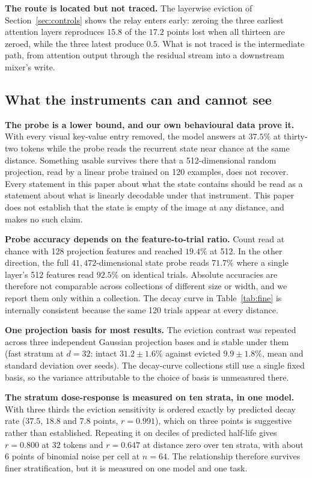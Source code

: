 \documentclass[11pt]{article}
\begin{document}
\textbf{The route is located but not traced.} The layerwise eviction of
Section~\ref{sec:controls} shows the relay enters early: zeroing the three
earliest attention layers reproduces $15.8$ of the $17.2$ points lost when all
thirteen are zeroed, while the three latest produce $0.5$. What is not traced is
the intermediate path, from attention output through the residual stream into a
downstream mixer's write.

\subsection{What the instruments can and cannot see}

\textbf{The probe is a lower bound, and our own behavioural data prove it.}
With every visual key-value entry removed, the model answers at $37.5\%$ at
thirty-two tokens while the probe reads the recurrent state near chance at the
same distance. Something usable survives there that a 512-dimensional random
projection, read by a linear probe trained on 120 examples, does not recover.
Every statement in this paper about what the state contains should be read as a
statement about what is linearly decodable under that instrument. This paper does
not establish that the state is empty of the image at any distance, and makes no
such claim.

\textbf{Probe accuracy depends on the feature-to-trial ratio.} Count read at
chance with 128 projection features and reached $19.4\%$ at 512. In the other
direction, the full $41{,}472$-dimensional state probe reads $71.7\%$ where a
single layer's 512 features read $92.5\%$ on identical trials. Absolute
accuracies are therefore not comparable across collections of different size or
width, and we report them only within a collection. The decay curve in
Table~\ref{tab:fine} is internally consistent because the same 120 trials appear
at every distance.

\textbf{One projection basis for most results.} The eviction contrast was
repeated across three independent Gaussian projection bases and is stable under
them (fast stratum at $d{=}32$: intact $31.2 \pm 1.6\%$ against evicted
$9.9 \pm 1.8\%$, mean and standard deviation over seeds). The decay-curve
collections still use a single fixed basis, so the variance attributable to the
choice of basis is unmeasured there.

\textbf{The stratum dose-response is measured on ten strata, in one model.}
With three thirds the eviction sensitivity is ordered exactly by predicted decay
rate ($37.5$, $18.8$ and $7.8$ points, $r = 0.991$), which on three points is
suggestive rather than established. Repeating it on deciles of predicted
half-life gives $r = 0.800$ at $32$ tokens and $r = 0.647$ at distance zero over
ten strata, with about $6$ points of binomial noise per cell at $n = 64$. The
relationship therefore survives finer stratification, but it is measured on one
model and one task.
\end{document}
